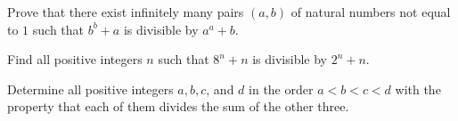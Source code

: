 \documentclass{subfile}
\begin{document}
	\begin{problem}
		Prove that there exist infinitely many pairs $ (a, b)$ of natural numbers not equal to $ 1$ such that $ b^b + a$ is divisible by $ a^a + b$.
	\end{problem}


	\begin{problem}
		Find all positive integers $n$ such that $8^n + n$ is divisible by $2^n + n$.  %
	\end{problem}

%

	\begin{problem}
		Determine all positive integers $a,b,c$, and $d$ in the order $a<b<c<d$ with the property that each of them divides the sum of the other three. %
	\end{problem}
\end{document}
